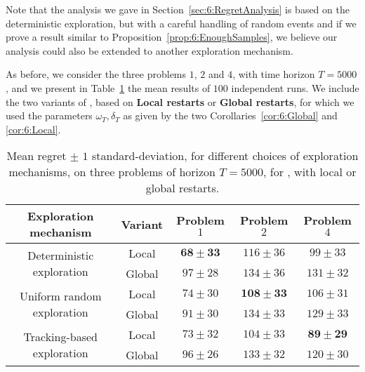 Note that the analysis we gave in Section~\ref{sec:6:RegretAnalysis} is based on the deterministic exploration, but with a careful handling of random events and if we prove a result similar to Proposition~\ref{prop:6:EnoughSamples}, we believe our analysis could also be extended to another exploration mechanism.

As before, we consider the three problems $1$, $2$ and $4$, with time horizon $T=5000$,
and we present in Table~\ref{table:6:exploringDifferentForcedExplorationMechanisms} the mean results of $100$ independent runs.
We include the two variants of \GLRklUCB, based on \textbf{Local restarts} or \textbf{Global restarts}, for which we used the parameters $\omega_T,\delta_T$ as given by the two Corollaries~\ref{cor:6:Global} and \ref{cor:6:Local}.

\begin{table}[ht]
    \centering
    \begin{tabular}{cc|ccc}
        \textbf{Exploration mechanism} & Variant & Problem $1$ & Problem $2$ & Problem $4$ \\
        \hline
        \multirow{2}{*}{Deterministic exploration}
        & Local   & $\mathbf{68 \pm 33}$ & $116 \pm 36$ & $99 \pm 33$ \\
        & Global  & $97 \pm 28$ & $134 \pm 36$ & $131 \pm 32$ \\
        \multirow{2}{*}{Uniform random exploration}
        & Local  & $74 \pm 30$ & $\mathbf{108 \pm 33}$ & $106 \pm 31$ \\
        & Global & $91 \pm 30$ & $134 \pm 33$ & $129 \pm 33$ \\
        \multirow{2}{*}{Tracking-based exploration}
        & Local  & $73 \pm 32$ & $104 \pm 33$ & $\mathbf{89 \pm 29}$ \\
        & Global & $96 \pm 26$ & $133 \pm 32$ & $120 \pm 30$
    \end{tabular}
    \caption{Mean regret $\pm$ $1$ standard-deviation, for different choices of exploration mechanisms, on three problems of horizon $T=5000$, for \GLRklUCB, with local or global restarts.}
    \label{table:6:exploringDifferentForcedExplorationMechanisms}
\end{table}

